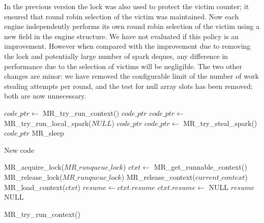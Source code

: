 In the previous version the lock was also used to protect the victim
counter;
it ensured that round robin selection of the victim was maintained.
Now each engine independently performs its own round robin selection of the
victim using a new field  in the engine structure.
We have not evaluated if this policy is an improvement.
However when compared with the improvement due to removing the lock and
potentially large number of spark deques,
any difference in performance due to the selection of victims will be
negligible.
The two other changes are minor:
we have removed the configurable limit of the number of work stealing
attempts per round,
and the test for null array slots has been removed;
both are now unnecessary.

\begin{algorithm}[tbp]
\begin{algorithmic}
        \State $code\_ptr \gets$ MR\_try\_run\_context()
            \Goto $code\_ptr$
        \EndIf
        \State $code\_ptr \gets$ MR\_try\_run\_local\_spark($NULL$)
            \Goto $code\_ptr$
        \EndIf
        \State $code\_ptr \gets$ MR\_try\_steal\_spark()
            \Goto $code\_ptr$
        \EndIf
        \Goto MR\_sleep
    \EndProcedure
\end{algorithmic}
\caption{New \idle code}
\label{alg:idle_entry_point}
\end{algorithm}

\begin{algorithm}[tbp]
\begin{algorithmic}
    \State MR\_acquire\_lock($MR\_runqueue\_lock$)
    \State $ctxt \gets$ MR\_get\_runnable\_context()
    \State MR\_release\_lock($MR\_runqueue\_lock$)
            \State MR\_release\_context($current\_context$)
        \EndIf
        \State MR\_load\_context($ctxt$)
        \State $resume \gets ctxt.resume$
        \State $ctxt.resume \gets$ NULL
        \State \Return $resume$
    \Else
        \State \Return NULL
    \EndIf
\EndProcedure
\end{algorithmic}
\caption{MR\_try\_run\_context()}
\label{alg:try_run_context}
\end{algorithm}


